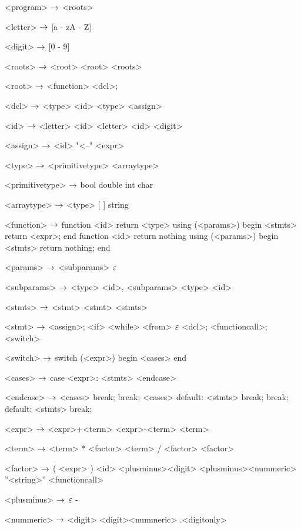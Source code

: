 



\begin{grammar}
<program> $\rightarrow$ <roots>

<letter> $\rightarrow$ [a - zA - Z]

<digit> $\rightarrow$ [0 - 9]

<roots> $\rightarrow$ <root>
\alt <root> <roots>

<root> $\rightarrow$ <function>
\alt <dcl>;

<dcl> $\rightarrow$ <type> <id>
\alt <type> <assign>

<id> $\rightarrow$ <letter>
	\alt<id> <letter>
	\alt<id> <digit>

<assign>  $\rightarrow$ <id> "<--" <expr>

<type> $\rightarrow$ <primitivetype>
\alt <arraytype>

<primitivetype> $\rightarrow$ bool
\alt double
\alt int
\alt char

<arraytype> $\rightarrow$ <type> [ ]
\alt string

<function> $\rightarrow$  function <id> return <type> using (<params>)
begin
	<stmts>
	return <expr>;
end
\alt function <id> return nothing using (<params>)
begin
	<stmts>
	return nothing;
end

<params> $\rightarrow$ <subparams>
	\alt $\varepsilon$

<subparams> $\rightarrow$ <type> <id>, <subparams>
\alt <type> <id>

<stmts> $\rightarrow$ <stmt>
	\alt <stmt> <stmts>

<stmt> $\rightarrow$ <assign>;
	\alt <if>
	\alt <while>
	\alt <from>
	\alt $\varepsilon$
	\alt <dcl>;
	\alt <functioncall>;
	\alt <switch>

<switch> $\rightarrow$ switch (<expr>)
		begin
			<cases>
		end

<cases> $\rightarrow$ case <expr>:
			<stmts>
		<endcase>
		
<endcase> $\rightarrow$ <cases>
		\alt break;
		\alt break;
		<cases>
		\alt default:
			<stmts>
			break;
		\alt break;
		default:
			<stmts>
			break;

<expr> $\rightarrow$ <expr>+<term>
	\alt<expr>-<term>
	\alt<term>

<term> $\rightarrow$ <term> * <factor>
	\alt <term> / <factor>
	\alt <factor>

<factor> $\rightarrow$ ( <expr> )
	\alt <id>
	\alt <plusminus><digit>
	\alt <plusminus><nummeric>
	\alt ''<string>''
	\alt <functioncall> 

<plusminus> $\rightarrow$ $\varepsilon$
	\alt -

<nummeric> $\rightarrow$ <digit>
	\alt <digit><nummeric>
	\alt .<digitonly>


\end{grammar}
